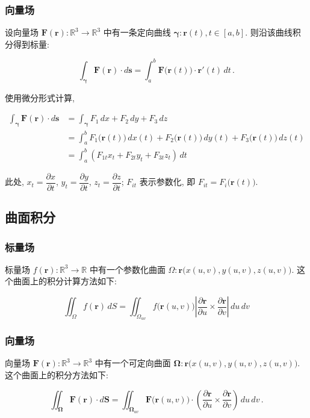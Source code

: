 \documentclass[UTF8]{ctexart}
\newcommand{\ve}[1]{\boldsymbol{\mathbf{#1}}}
\newcommand{\R}{\mathbb R}
\begin{document}
\subsubsection{向量场}
设向量场 $ \ve{F}(\ve{r}) : \R^3 \to \R^3 $ 中有一条定向曲线 $ \ve{\gamma}: \ve{r}(t), t \in [a, b] $. 则沿该曲线积分得到标量:
\begin{thmbox}
    \[ \int_{\ve{\gamma}} \ve{F} (\ve{r}) \cdot d\ve{s} = \int_{a}^{b} \ve{F} \big( \ve{r} (t) \big) \cdot \ve{r}'(t) \,dt \,.\]
\end{thmbox} 

使用微分形式计算, 
\begin{thmbox}
    \begin{align*}
        \int_{\ve{\gamma}} \ve{F} (\ve{r}) \cdot d\ve{s} &= \int_{\ve{\gamma}} F_1 \,dx + F_2 \,dy + F_3 \,dz \\ 
        &= \int_{a}^{b} F_1 \big( \ve{r} (t) \big) \, dx(t) + F_2 \big( \ve{r} (t) \big) \, dy(t) + F_3 \big( \ve{r} (t) \big) \, dz(t) \\
        &= \int_{a}^{b} (F_{1t} x_t + F_{2t} y_t + F_{3t} z_t) \,dt
    \end{align*}
\end{thmbox}

此处, $ x_t = \dfrac{\partial x}{\partial t} $, $ y_t = \dfrac{\partial y}{\partial t} $, $ z_t = \dfrac{\partial z}{\partial t} $; $ F_{it} $ 表示参数化, 即 $ F_{it} = F_i \big( \ve{r} (t) \big) $.

\subsection{曲面积分}
\subsubsection{标量场}
标量场 $ f (\ve{r}) : \R^3 \to \R $ 中有一个参数化曲面 $ \Omega: \ve{r}\big( x(u, v), y(u, v), z(u, v) \big) $. 这个曲面上的积分计算方法如下:
\begin{thmbox}
    \[ \iint_\Omega f(\ve{r}) \,dS = \iint_{\Omega_{uv}} f\big( \ve{r}(u, v) \big) \left| \dfrac{\partial \ve{r}}{\partial u} \times \dfrac{\partial \ve{r}}{\partial v} \right| \,du\,dv \]
\end{thmbox}

\subsubsection{向量场}
向量场 $ \ve{F} (\ve{r}) : \R^3 \to \R^3 $ 中有一个可定向曲面 $ \ve{\Omega}: \ve{r}\big( x(u, v), y(u, v), z(u, v) \big) $. 这个曲面上的积分方法如下:
\begin{thmbox}
    \[ \iint_{\ve{\Omega}} \ve{F} (\ve{r}) \cdot d\ve{S} = \iint_{\ve{\Omega}_{uv}} \ve{F} \big( \ve{r} (u, v) \big) \cdot \left( \dfrac{\partial \ve{r}}{\partial u} \times \dfrac{\partial \ve{r}}{\partial v} \right) \,du\,dv \,.\]
\end{thmbox}
\end{document}

